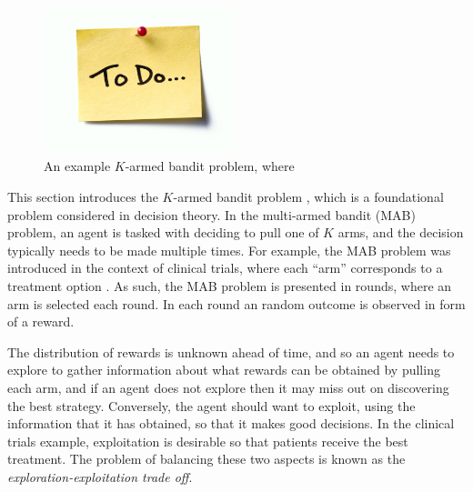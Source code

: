     \begin{figure}
        \centering\includegraphics[width=0.5\textwidth]{figures/todo.jpg} 
        \caption[An example $K$-armed bandit problem.]{An example $K$-armed bandit problem, where }
        \label{fig:mab_example}
    \end{figure}




    This section introduces the $K$-armed bandit problem , which is a foundational problem considered in decision theory. In the multi-armed bandit (MAB) problem, an agent is tasked with deciding to pull one of $K$ arms, and the decision typically needs to be made multiple times. For example, the MAB problem was introduced in the context of clinical trials, where each ``arm'' corresponds to a treatment option . As such, the MAB problem is presented in rounds, where an arm is selected each round. In each round an random outcome is observed in form of a reward.

    The distribution of rewards is unknown ahead of time, and so an agent needs to explore to gather information about what rewards can be obtained by pulling each arm, and if an agent does not explore then it may miss out on discovering the best strategy. Conversely, the agent should want to exploit, using the information that it has obtained, so that it makes good decisions. In the clinical trials example, exploitation is desirable so that patients receive the best treatment. The problem of balancing these two aspects is known as the \textit{exploration-exploitation trade off}.
    
